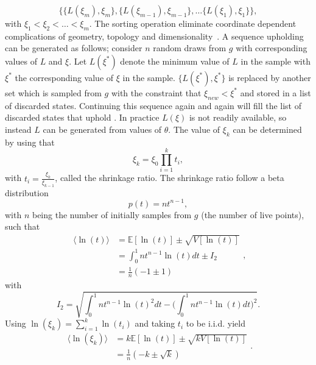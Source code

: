 \begin{equation}
	\{\{L(\xi_m),\xi_m\},\{L(\xi_{m-1}),\xi_{m-1}\},\dots\{L(\xi_1),\xi_1\}\},
	\label{seq}
\end{equation}
with $\xi_1<\xi_2<\dots <\xi_m$. The sorting operation eliminate coordinate dependent complications of geometry, topology and dimensionality~\citep{skilling2006}. A sequence upholding  can be generated as follows; consider $n$ random draws from $g$ with corresponding values of $L$ and $\xi$. Let $L(\xi^*)$ denote the minimum value of $L$ in the sample with $\xi^*$ the corresponding value of $\xi$ in the sample. $\{L(\xi^*), \xi^*\}$ is replaced by another set which is sampled from $g$ with the constraint that $\xi_{new}<\xi^*$ and stored in a list of discarded states. Continuing this sequence again and again will fill the list of discarded states that uphold . In practice $L(\xi)$ is not readily available, so instead $L$ can be generated from values of $\theta$. The value of $\xi_k$ can be determined by using that~\citep{skilling2004}
\begin{equation}
	\xi_k=\xi_0\prod_{i=1}^{k}t_i,
\end{equation}
with $t_i=\frac{\xi_k}{\xi_{k-1}}$, called the shrinkage ratio. The shrinkage ratio follow a beta distribution
\begin{equation}
	p(t)=nt^{n-1},
\end{equation}
with $n$ being the number of initially samples from $g$ (the number of live points), such that 
\begin{equation}
	\begin{split}
		\langle\ln(t)\rangle&=\mathbb{E}[\ln(t)]\pm \sqrt{V[\ln(t)]}\\
		&=\int_0^1 nt^{n-1}\ln(t)dt\pm I_2\\
		&=\frac{1}{n}(-1\pm 1)
	\end{split},
\end{equation}
with 
\begin{equation}
	I_2 = \sqrt{\int_0^1nt^{n-1}\ln(t)^2dt-\bigg(\int_0^1nt^{n-1}\ln(t)dt\bigg)^2}.
\end{equation}
Using $\ln(\xi_k)=\sum_{i=1}^k\ln(t_i)$ and taking $t_i$ to be i.i.d. yield
\begin{equation}
	\begin{split}
		\langle\ln(\xi_k)\rangle&=k\mathbb{E}[\ln(t)]\pm \sqrt{kV[\ln(t)]}\\
		&=\frac{1}{n}(-k\pm \sqrt{k})
	\end{split}.
	\label{eqln}
\end{equation}
